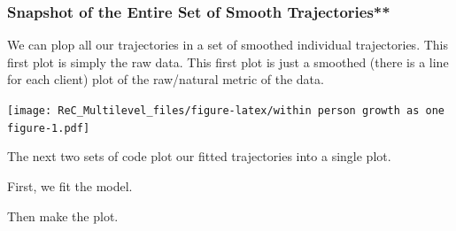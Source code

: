\documentclass[
  11pt,
]{book}
\newenvironment{Shaded}{\begin{snugshade}}{\end{snugshade}}
\newcommand{\AttributeTok}[1]{\textcolor[rgb]{0.77,0.63,0.00}{#1}}
\newcommand{\CommentTok}[1]{\textcolor[rgb]{0.56,0.35,0.01}{\textit{#1}}}
\newcommand{\ControlFlowTok}[1]{\textcolor[rgb]{0.13,0.29,0.53}{\textbf{#1}}}
\newcommand{\FunctionTok}[1]{\textcolor[rgb]{0.00,0.00,0.00}{#1}}
\newcommand{\NormalTok}[1]{#1}
\newcommand{\OtherTok}[1]{\textcolor[rgb]{0.56,0.35,0.01}{#1}}
\newcommand{\SpecialCharTok}[1]{\textcolor[rgb]{0.00,0.00,0.00}{#1}}
\newcommand{\StringTok}[1]{\textcolor[rgb]{0.31,0.60,0.02}{#1}}
\begin{document}
\hypertarget{snapshot-of-the-entire-set-of-smooth-trajectories}{%
\subsubsection{Snapshot of the Entire Set of Smooth Trajectories**}\label{snapshot-of-the-entire-set-of-smooth-trajectories}}

We can plop all our trajectories in a set of smoothed individual trajectories. This first plot is simply the raw data. This first plot is just a smoothed (there is a line for each client) plot of the raw/natural metric of the data.

\begin{Shaded}
\end{Shaded}

\texttt{[image: ReC\_Multilevel\_files/figure-latex/within person growth as one figure-1.pdf]}

The next two sets of code plot our fitted trajectories into a single plot.

First, we fit the model.

\begin{Shaded}
\end{Shaded}

Then make the plot.

\begin{Shaded}
\end{Shaded}
\end{document}

